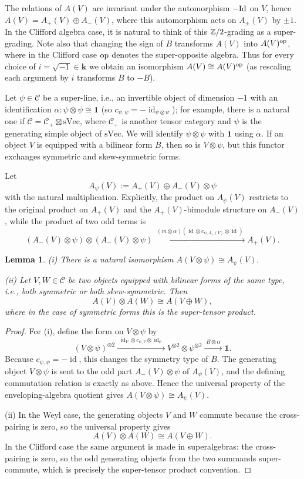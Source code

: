 \documentclass[12pt]{amsart}
\numberwithin{equation}{section}
\providecommand{\k}{}\renewcommand{\k}{\mathbf{k}}
\providecommand{\C}{}\renewcommand{\C}{\mathcal{C}}
\providecommand{\sVec}{}\renewcommand{\sVec}{\mathrm{sVec}}
\providecommand{\id}{}\renewcommand{\id}{\operatorname{id}}
\theoremstyle{plain}
\newtheorem{lemma}[theorem]{Lemma}
\theoremstyle{definition}
\theoremstyle{remark}
\begin{document}
The relations of $A(V)$ are invariant under the automorphism $-{\rm Id}$ on $V$, hence 
$A(V)=A_+(V)\oplus A_-(V)$, where this automorphism acts on $A_\pm(V)$ by $\pm 1$. 
In the Clifford algebra case, it is natural to think of this $\Bbb Z/2$-grading as a super-grading. 
Note also that changing the sign of $B$ transforms $A(V)$ into $A(V)^{\rm op}$, where in the Clifford case ${\rm op}$ 
denotes the super-opposite algebra. Thus for every choice of $i=\sqrt{-1}\in \k$ we obtain an isomorphism 
$A(V)\cong A(V)^{\rm op}$ (as rescaling each argument by $i$ transforms $B$ to $-B$). 

Let $\psi\in \C$ be a super-line, i.e., an invertible object of dimension $-1$ with an identification $\alpha: \psi\otimes \psi\cong \mathbf{1}$ (so $c_{\psi,\psi}=-\id_{\psi\otimes\psi}$); for example,
there is a natural one if $\C=\C_+\boxtimes \sVec$, where $\C_+$ is another tensor category and $\psi$ is the generating simple object of $\sVec$. We will identify $\psi\otimes \psi$ with ${\mathbf 1}$ using $\alpha$. 
If an object $V$ is equipped with a bilinear form $B$, then so is $V\otimes \psi$, but this 
functor exchanges symmetric and skew-symmetric forms. 

Let 
$$
A_\psi(V):=A_+(V)\oplus A_-(V)\otimes \psi
$$
with the natural multiplication.
Explicitly, the product on $A_\psi(V)$ restricts to the original product on $A_+(V)$ and the $A_+(V)$-bimodule structure on $A_-(V)$, while the product of two odd terms is
\[
(A_-(V)\otimes\psi)\otimes(A_-(V)\otimes\psi)\xrightarrow{\;(m\otimes\alpha)(\id\otimes c_{\psi,A_-(V)}\otimes \id)\;}A_+(V).
\]


\begin{lemma}\label{leweyl1}  (i) There is a natural isomorphism 
$
A(V\otimes \psi)\cong A_\psi(V).
$

(ii) Let $V,W\in \C$ be two objects equipped with bilinear forms of the same type, i.e., both symmetric or both skew-symmetric. Then 
$$
A(V)\otimes A(W)\cong A(V\oplus W),
$$ 
where in the case of symmetric forms this is the super-tensor product.
\end{lemma} 

\begin{proof}
For (i), define the form on $V\otimes\psi$ by
\[
(V\otimes\psi)^{\otimes2}\xrightarrow{\;\id_V\otimes c_{\psi,V}\otimes\id_\psi\;}V^{\otimes2}\otimes\psi^{\otimes2}
\xrightarrow{\;B\otimes\alpha\;}\mathbf{1}.
\]
Because $c_{\psi,\psi}=-\id$, this changes the symmetry type of $B$. The generating object $V\otimes\psi$ is sent to the odd part $A_-(V)\otimes\psi$ of $A_\psi(V)$, and the defining commutation relation is exactly as above. Hence the universal property of the enveloping-algebra quotient gives $A(V\otimes\psi)\cong A_\psi(V)$.

 (ii) In the Weyl case, the generating objects $V$ and $W$ commute because the cross-pairing is zero, so the universal property gives 
$$
A(V)\otimes A(W)\cong A(V\oplus W).
$$ 
In the Clifford case the same argument is made in superalgebras: the cross-pairing is zero, so the odd generating objects from the two summands super-commute, which is precisely the super-tensor product convention.
\end{proof} 
\end{document}
